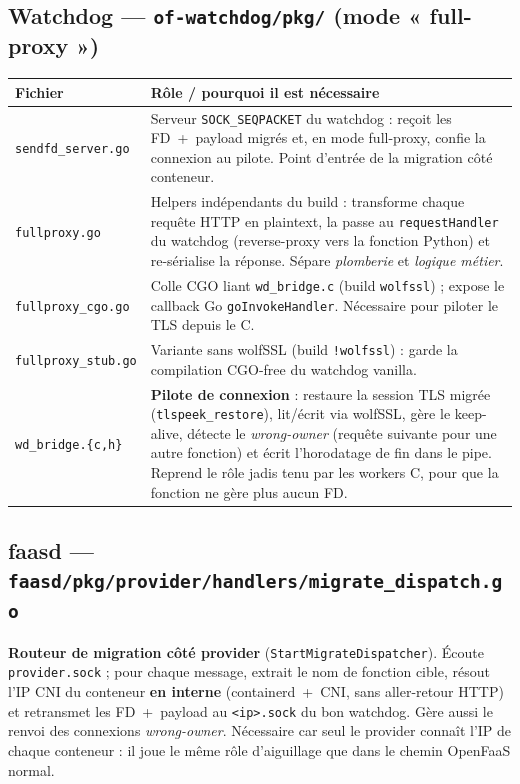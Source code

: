 \documentclass[10pt,a4paper]{article}
\newcommand{\code}[1]{\texttt{\small #1}}
\begin{document}
\subsection{Watchdog — \code{of-watchdog/pkg/} (mode « full-proxy »)}
\begin{center}\footnotesize
\begin{tabular}{@{}p{3.15cm} p{13.4cm}@{}}
\toprule
\textbf{Fichier} & \textbf{Rôle / pourquoi il est nécessaire} \\
\midrule
\code{sendfd\_server.go} & Serveur \code{SOCK\_SEQPACKET} du watchdog : reçoit les FD~+~payload migrés et, en mode full-proxy, confie la connexion au pilote. Point d'entrée de la migration côté conteneur. \\
\code{fullproxy.go} & Helpers indépendants du build : transforme chaque requête HTTP en plaintext, la passe au \code{requestHandler} du watchdog (reverse-proxy vers la fonction Python) et re-sérialise la réponse. Sépare \emph{plomberie} et \emph{logique métier}. \\
\code{fullproxy\_cgo.go} & Colle CGO liant \code{wd\_bridge.c} (build \code{wolfssl}) ; expose le callback Go \code{goInvokeHandler}. Nécessaire pour piloter le TLS depuis le C. \\
\code{fullproxy\_stub.go} & Variante sans wolfSSL (build \code{!wolfssl}) : garde la compilation CGO-free du watchdog vanilla. \\
\code{wd\_bridge.\{c,h\}} & \textbf{Pilote de connexion} : restaure la session TLS migrée (\code{tlspeek\_restore}), lit/écrit via wolfSSL, gère le keep-alive, détecte le \emph{wrong-owner} (requête suivante pour une autre fonction) et écrit l'horodatage de fin dans le pipe. Reprend le rôle jadis tenu par les workers C, pour que la fonction ne gère plus aucun FD. \\
\bottomrule
\end{tabular}
\end{center}

\subsection{faasd — \code{faasd/pkg/provider/handlers/migrate\_dispatch.go}}
\textbf{Routeur de migration côté provider} (\code{StartMigrateDispatcher}). Écoute
\code{provider.sock} ; pour chaque message, extrait le nom de fonction cible, résout l'IP CNI du
conteneur \textbf{en interne} (containerd~+~CNI, sans aller-retour HTTP) et retransmet les FD~+~payload
au \code{<ip>.sock} du bon watchdog. Gère aussi le renvoi des connexions \emph{wrong-owner}. Nécessaire
car seul le provider connaît l'IP de chaque conteneur : il joue le même rôle d'aiguillage que dans le
chemin OpenFaaS normal.
\end{document}

